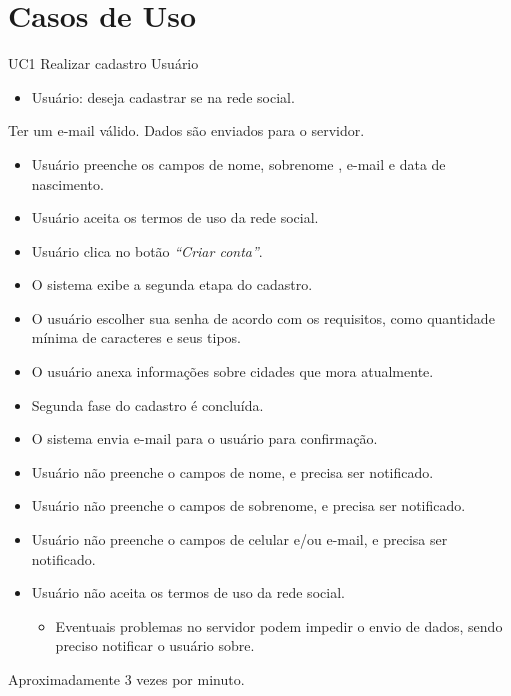 \chapter{Casos de Uso}

\casoDeUso
{UC1}
{Realizar cadastro}
{Usuário}
{
\begin{itemize}
	\item Usuário: deseja cadastrar se na rede social.	
\end{itemize}

}
{Ter um e-mail válido.}
{Dados são enviados para o servidor.}
{
\begin{itemize}
	\item Usuário preenche os campos de nome, sobrenome , e-mail e data de nascimento.	
	\item Usuário aceita os termos de uso da rede social.		
	\item Usuário clica no botão \textit{“Criar conta”}.	
	\item O sistema exibe a segunda etapa do cadastro.		
	\item O usuário escolher sua senha de acordo com  os requisitos, como quantidade mínima de caracteres e seus tipos.		
	\item O usuário anexa informações sobre cidades que mora atualmente.	
	\item Segunda fase do cadastro é concluída.			
	\item O sistema envia e-mail para o usuário para confirmação.
			
\end{itemize}
}
{
\begin{itemize}
	\item Usuário não preenche o campos de nome, e precisa ser notificado.
	\item Usuário não preenche o campos de sobrenome, e precisa ser notificado.
	\item Usuário não preenche o campos de celular e/ou e-mail, e precisa ser notificado.
	\item Usuário não aceita os termos de uso da rede social.

	\begin{itemize}
		\item Eventuais problemas no servidor podem impedir o envio de dados, sendo preciso notificar o usuário sobre.
	\end{itemize}
\end{itemize}
}
{Aproximadamente 3 vezes por minuto.}
{

}

